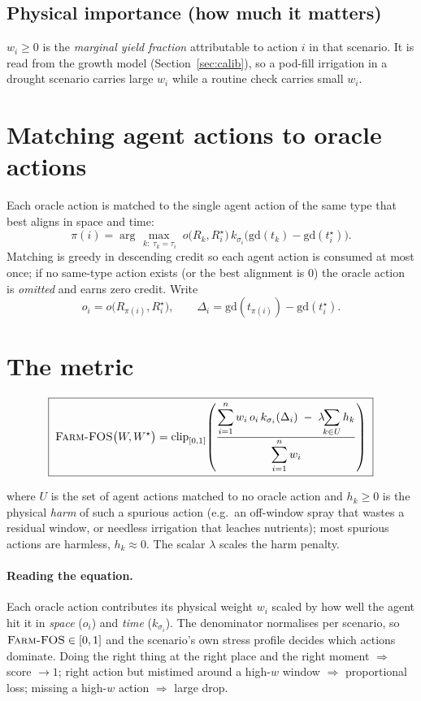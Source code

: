 \documentclass[11pt]{article}
\newcommand{\farmfos}{\textsc{Farm-FOS}}
\newcommand{\gd}{\mathrm{gd}}        %
\newcommand{\clip}{\operatorname{clip}}
\begin{document}
\subsection{Physical importance (how much it matters)}
$w_i\ge 0$ is the \emph{marginal yield fraction} attributable to action $i$ in
that scenario. It is read from the growth model (Section~\ref{sec:calib}), so a
pod-fill irrigation in a drought scenario carries large $w_i$ while a routine
check carries small $w_i$.

\section{Matching agent actions to oracle actions}

Each oracle action is matched to the single agent action of the same type that
best aligns in space and time:
\[
\pi(i)=\arg\max_{\,k:\;\tau_k=\tau_i}\;
o\bigl(R_k,R^\star_i\bigr)\,k_{\sigma_i}\!\bigl(\gd(t_k)-\gd(t^\star_i)\bigr).
\]
Matching is greedy in descending credit so each agent action is consumed at most
once; if no same-type action exists (or the best alignment is $0$) the oracle
action is \emph{omitted} and earns zero credit. Write
\[
o_i=o\bigl(R_{\pi(i)},R^\star_i\bigr),\qquad
\Delta_i=\gd(t_{\pi(i)})-\gd(t^\star_i).
\]

\section{The metric}

\begin{equation}
\boxed{\;
\farmfos\bigl(W,W^\star\bigr)=
\clip_{[0,1]}\!\left(
\frac{\displaystyle\sum_{i=1}^{n} w_i\,o_i\,k_{\sigma_i}(\Delta_i)
\;-\;\lambda\!\!\sum_{k\in U} h_k}
{\displaystyle\sum_{i=1}^{n} w_i}
\right)\;}
\label{eq:farmfos}
\end{equation}

\noindent where $U$ is the set of agent actions matched to no oracle action and
$h_k\ge 0$ is the physical \emph{harm} of such a spurious action (e.g.\ an
off-window spray that wastes a residual window, or needless irrigation that
leaches nutrients); most spurious actions are harmless, $h_k\approx0$. The scalar
$\lambda$ scales the harm penalty.

\paragraph{Reading the equation.} Each oracle action contributes its physical
weight $w_i$ scaled by how well the agent hit it in \emph{space} ($o_i$) and
\emph{time} ($k_{\sigma_i}$). The denominator normalises per scenario, so
$\farmfos\in[0,1]$ and the scenario's own stress profile decides which actions
dominate. Doing the right thing at the right place and the right moment
$\Rightarrow$ score $\to 1$; right action but mistimed around a high-$w$ window
$\Rightarrow$ proportional loss; missing a high-$w$ action $\Rightarrow$ large
drop.
\end{document}
